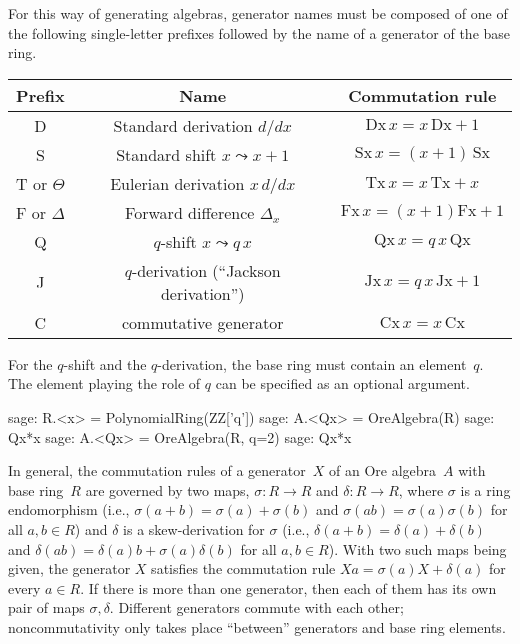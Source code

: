 \documentclass{amsart}
\begin{document}
For this way of generating algebras, generator names must be composed of
one of the following single-letter prefixes followed by the name of a generator
of the base ring. 

\begin{center}
  \begin{tabular}{|c|c|c|}\hline
    Prefix & Name & Commutation rule \\\hline
     D & Standard derivation $d/dx$ & $\mathrm{Dx}\,x=x\,\mathrm{Dx}+1$ \\
     S & Standard shift $x\leadsto x+1$ & $\mathrm{Sx}\,x=(x+1)\,\mathrm{Sx}$ \\
     T or $\Theta$ & Eulerian derivation $x\,d/dx$ & $\mathrm{Tx}\,x=x\,\mathrm{Tx}+x$ \\
     F or $\Delta$ & Forward difference $\Delta_x$ & $\mathrm{Fx}\,x=(x+1)\mathrm{Fx}+1$ \\
     Q & $q$-shift $x\leadsto q\,x$ & $\mathrm{Qx}\,x=q\,x\,\mathrm{Qx}$ \\
     J & $q$-derivation (``Jackson derivation'') & $\mathrm{Jx}\,x=q\,x\,\mathrm{Jx}+1$ \\ 
     C & commutative generator & $\mathrm{Cx}\,x = x\,\mathrm{Cx}$ \\\hline
  \end{tabular}
\end{center}

For the $q$-shift and the $q$-derivation, the base ring must contain an element~$q$.
The element playing the role of $q$ can be specified as an optional argument. 

\begin{sageexample}
  sage: R.<x> = PolynomialRing(ZZ['q'])
  sage: A.<Qx> = OreAlgebra(R)
  sage: Qx*x
  sage: A.<Qx> = OreAlgebra(R, q=2)
  sage: Qx*x
\end{sageexample}

In general, the commutation rules of a generator~$X$ of an Ore algebra~$A$ with
base ring~$R$ are governed by two maps, $\sigma\colon R\to R$ and $\delta\colon R\to R$,
where $\sigma$ is a ring endomorphism (i.e., $\sigma(a+b)=\sigma(a)+\sigma(b)$ and
$\sigma(ab)=\sigma(a)\sigma(b)$ for all $a,b\in R$) and $\delta$ is a skew-derivation
for $\sigma$ (i.e., $\delta(a+b)=\delta(a)+\delta(b)$ and $\delta(ab)=\delta(a)b
+\sigma(a)\delta(b)$ for all $a,b\in R$). With two such maps being given, the
generator $X$ satisfies the commutation rule $Xa=\sigma(a)X+\delta(a)$ for every
$a\in R$. If there is more than one generator, then each of them has its own pair
of maps $\sigma,\delta$. Different generators commute with each other; 
noncommutativity only takes place ``between'' generators and base ring elements. 
\end{document}
